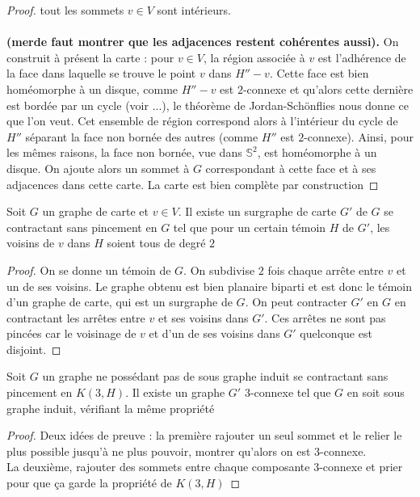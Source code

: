 \documentclass{scrartcl}
\begin{document}
\begin{flushleft}
\begin{proof}
    tout les sommets $v \in V$ sont intérieurs.
    \\~\\
    \textbf{(merde faut montrer que les adjacences restent cohérentes aussi).}
    On construit à présent la carte : pour $v \in V$, la région associée à $v$ est l'adhérence de la face dans laquelle se trouve
    le point $v$ dans $H'' - v$. Cette face est bien homéomorphe à un disque, comme $H'' - v$ est $2$-connexe et qu'alors
    cette dernière est bordée par un cycle (voir ...), le théorème de Jordan-Schönflies nous donne ce que l'on veut.
    Cet ensemble de région correspond alors à l'intérieur du cycle de $H''$
    séparant la face non bornée des autres (comme $H''$ est $2$-connexe). Ainsi, pour les mêmes raisons, la face non bornée, vue dans $\mathbb{S}^2$,
    est homéomorphe à un disque. On ajoute alors un sommet à $G$ correspondant à cette face et à ses adjacences dans cette carte.
    La carte est bien complète par construction

\end{proof}

\begin{lem}
    Soit $G$ un graphe de carte et $v \in V$. Il existe un surgraphe de carte $G'$ de $G$ se contractant sans pincement en $G$
    tel que pour un certain témoin $H$ de $G'$, les voisins de $v$ dans $H$ soient tous de degré $2$
\end{lem}

\begin{proof}
    On se donne un témoin de $G$. On subdivise $2$ fois chaque arrête entre $v$ et un de ses voisins. Le graphe obtenu est bien
    planaire biparti et est donc le témoin d'un graphe de carte, qui est un surgraphe de $G$. On peut contracter $G'$
    en $G$ en contractant les arrêtes entre $v$ et ses voisins dans $G'$. Ces arrêtes ne sont pas pincées car le voisinage de $v$
    et d'un de ses voisins dans $G'$ quelconque est disjoint.
\end{proof}

\begin{lem}
    Soit $G$ un graphe ne possédant pas de sous graphe induit se contractant sans pincement en $K(3, H)$. Il existe un
    graphe $G'$ $3$-connexe tel que $G$ en soit sous graphe induit, vérifiant la même propriété
\end{lem}

\begin{proof}
    Deux idées de preuve : la première rajouter un seul sommet et le relier le plus possible jusqu'à ne plus pouvoir, montrer
    qu'alors on est $3$-connexe.\\
    La deuxième, rajouter des sommets entre chaque composante $3$-connexe et prier pour que ça garde la propriété
    de $K(3, H)$
\end{proof}


\end{flushleft}
\end{document}
